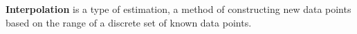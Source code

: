 \documentclass[main.tex]{subfiles}
\begin{document}
\begin{definition}
\textbf{Interpolation} is a type of estimation, a method of constructing new data points based on the range of a discrete set of known data points.
\end{definition}
\end{document}
